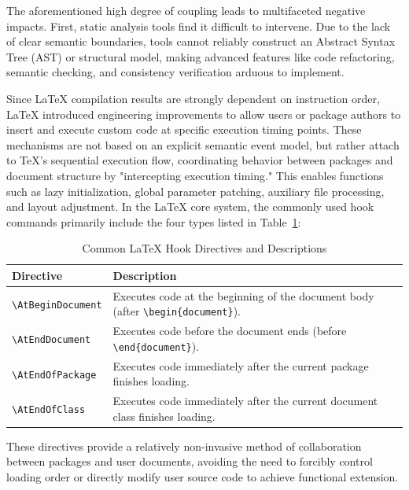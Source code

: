 The aforementioned high degree of coupling leads to multifaceted negative impacts. First, static analysis tools find it difficult to intervene. Due to the lack of clear semantic boundaries, tools cannot reliably construct an Abstract Syntax Tree (AST) or structural model, making advanced features like code refactoring, semantic checking, and consistency verification arduous to implement.

Since \LaTeX{} compilation results are strongly dependent on instruction order, \LaTeX{} introduced engineering improvements to allow users or package authors to insert and execute custom code at specific execution timing points. These mechanisms are not based on an explicit semantic event model, but rather attach to \TeX{}'s sequential execution flow, coordinating behavior between packages and document structure by "intercepting execution timing." This enables functions such as lazy initialization, global parameter patching, auxiliary file processing, and layout adjustment. In the \LaTeX{} core system, the commonly used hook commands primarily include the four types listed in Table~\ref{tab:latex-hooks}:

\begin{table}[htbp]
  \centering
  \caption{Common \LaTeX{} Hook Directives and Descriptions}
  \label{tab:latex-hooks}
  \begin{tabular}{lp{9.5cm}}
    \toprule
    \textbf{Directive}                      & \textbf{Description}                                                                                   \\
    \midrule
    \texttt{\textbackslash AtBeginDocument} & Executes code at the beginning of the document body (after \texttt{\textbackslash begin\{document\}}). \\
    \texttt{\textbackslash AtEndDocument}   & Executes code before the document ends (before \texttt{\textbackslash end\{document\}}).               \\
    \texttt{\textbackslash AtEndOfPackage}  & Executes code immediately after the current package finishes loading.                                  \\
    \texttt{\textbackslash AtEndOfClass}    & Executes code immediately after the current document class finishes loading.                           \\
    \bottomrule
  \end{tabular}
\end{table}

These directives provide a relatively non-invasive method of collaboration between packages and user documents, avoiding the need to forcibly control loading order or directly modify user source code to achieve functional extension.

